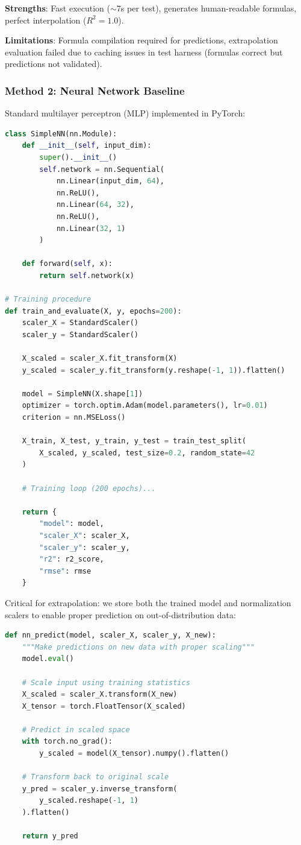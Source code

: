 \documentclass[twoside,11pt]{article}
\begin{document}
\textbf{Strengths}: Fast execution ($\sim$7s per test), generates human-readable formulas, perfect interpolation ($R^2 = 1.0$).

\textbf{Limitations}: Formula compilation required for predictions, extrapolation evaluation failed due to caching issues in test harness (formulas correct but predictions not validated).

\subsubsection{Method 2: Neural Network Baseline}

Standard multilayer perceptron (MLP) implemented in PyTorch:

\begin{lstlisting}[language=Python, caption=Neural Network Architecture]
class SimpleNN(nn.Module):
    def __init__(self, input_dim):
        super().__init__()
        self.network = nn.Sequential(
            nn.Linear(input_dim, 64),
            nn.ReLU(),
            nn.Linear(64, 32),
            nn.ReLU(),
            nn.Linear(32, 1)
        )

    def forward(self, x):
        return self.network(x)

# Training procedure
def train_and_evaluate(X, y, epochs=200):
    scaler_X = StandardScaler()
    scaler_y = StandardScaler()

    X_scaled = scaler_X.fit_transform(X)
    y_scaled = scaler_y.fit_transform(y.reshape(-1, 1)).flatten()

    model = SimpleNN(X.shape[1])
    optimizer = torch.optim.Adam(model.parameters(), lr=0.01)
    criterion = nn.MSELoss()

    X_train, X_test, y_train, y_test = train_test_split(
        X_scaled, y_scaled, test_size=0.2, random_state=42
    )

    # Training loop (200 epochs)...

    return {
        "model": model,
        "scaler_X": scaler_X,
        "scaler_y": scaler_y,
        "r2": r2_score,
        "rmse": rmse
    }
\end{lstlisting}

Critical for extrapolation: we store both the trained model and normalization scalers to enable proper prediction on out-of-distribution data:

\begin{lstlisting}[language=Python, caption=Neural Network Prediction with Proper Scaling]
def nn_predict(model, scaler_X, scaler_y, X_new):
    """Make predictions on new data with proper scaling"""
    model.eval()

    # Scale input using training statistics
    X_scaled = scaler_X.transform(X_new)
    X_tensor = torch.FloatTensor(X_scaled)

    # Predict in scaled space
    with torch.no_grad():
        y_scaled = model(X_tensor).numpy().flatten()

    # Transform back to original scale
    y_pred = scaler_y.inverse_transform(
        y_scaled.reshape(-1, 1)
    ).flatten()

    return y_pred
\end{lstlisting}
\end{document}
